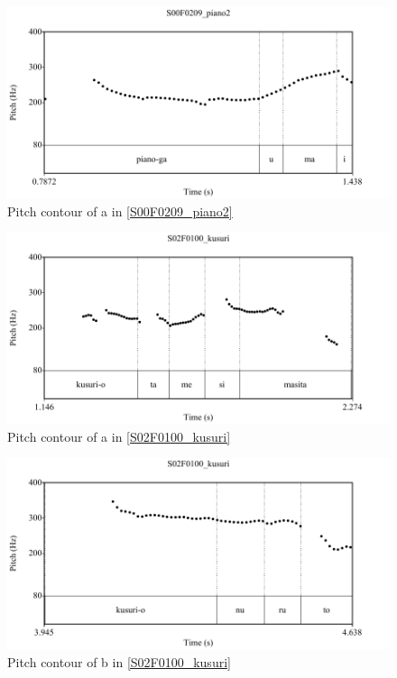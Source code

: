 \begin{figure}
	\begin{center}
	\includegraphics[width=.5\textwidth]{sounds/S00F0209_piano2.pdf}
	\caption{Pitch contour of a in \ref{S00F0209_piano2}}
	\label{S00F0209_piano2F}
	\end{center}
\end{figure}
\begin{figure}
	\begin{center}
	\includegraphics[width=.6\textwidth]{sounds/S02F0100_kusuri_piu.pdf}
	\caption{Pitch contour of a in \ref{S02F0100_kusuri}}
	\label{S02F0100_kusuri_piuF}
	\end{center}
\end{figure}
\begin{figure}
	\begin{center}
	\includegraphics[width=.6\textwidth]{sounds/S02F0100_kusuri_ciu.pdf}
	\caption{Pitch contour of b in \ref{S02F0100_kusuri}}
	\label{S02F0100_kusuri_ciuF}
	\end{center}
\end{figure}

